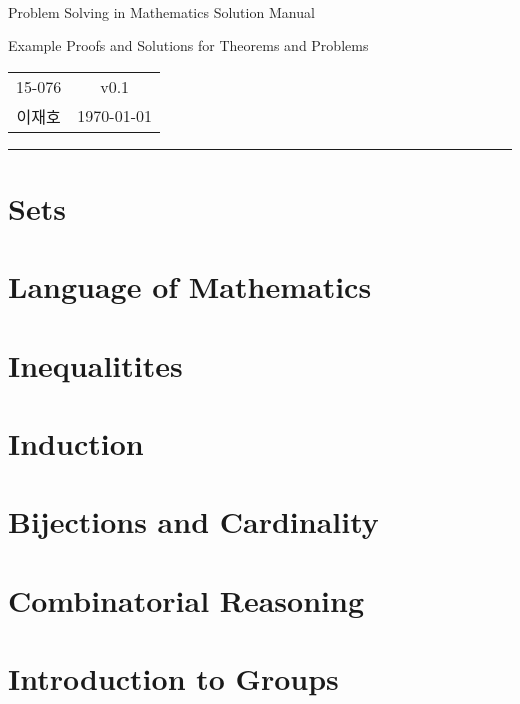 \documentclass[a4paper, 10pt, twoside, calcwidth]{oblivoir}
\theoremstyle{definition}
\begin{document}
\begin{center}\sffamily
\text{ }\\[1cm]
\huge Problem Solving in Mathematics Solution Manual

\vspace{.1cm}
\Large Example Proofs and Solutions for Theorems and Problems\\[.6cm]
	\begin{tabular} {c c}
		15-076 & v0.1\\
		이재호 & \today
	\end{tabular}
\end{center}
\vspace{.5cm}
\noindent\rule[0.5ex]{\linewidth}{.5pt}
\tableofcontents*
\section{Sets}



\section{Language of Mathematics}



\section{Inequalitites}



\section{Induction}



\section{Bijections and Cardinality}



\section{Combinatorial Reasoning}



\section{Introduction to Groups}


\end{document}
